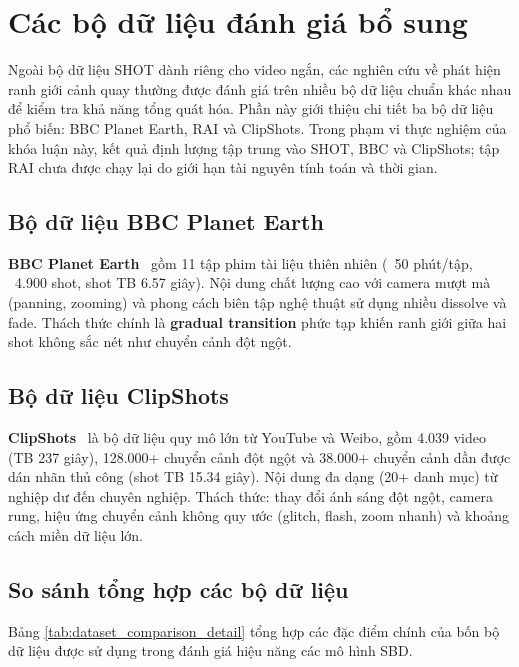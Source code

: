 \section{Các bộ dữ liệu đánh giá bổ sung}
Ngoài bộ dữ liệu SHOT dành riêng cho video ngắn, các nghiên cứu về phát hiện ranh giới cảnh quay thường được đánh giá trên nhiều bộ dữ liệu chuẩn khác nhau để kiểm tra khả năng tổng quát hóa. Phần này giới thiệu chi tiết ba bộ dữ liệu phổ biến: BBC Planet Earth, RAI và ClipShots.
Trong phạm vi thực nghiệm của khóa luận này, kết quả định lượng tập trung vào SHOT, BBC và ClipShots; tập RAI chưa được chạy lại do giới hạn tài nguyên tính toán và thời gian.

\subsection{Bộ dữ liệu BBC Planet Earth}
\textbf{BBC Planet Earth}~\cite{baraldi2015rai} gồm 11 tập phim tài liệu thiên nhiên (~50 phút/tập, ~4.900 shot, shot TB 6.57 giây). Nội dung chất lượng cao với camera mượt mà (panning, zooming) và phong cách biên tập nghệ thuật sử dụng nhiều dissolve và fade. Thách thức chính là \textbf{gradual transition} phức tạp khiến ranh giới giữa hai shot không sắc nét như chuyển cảnh đột ngột.

\subsection{Bộ dữ liệu ClipShots}
\textbf{ClipShots}~\cite{tang2018clipshots} là bộ dữ liệu quy mô lớn từ YouTube và Weibo, gồm 4.039 video (TB 237 giây), 128.000+ chuyển cảnh đột ngột và 38.000+ chuyển cảnh dần được dán nhãn thủ công (shot TB 15.34 giây). Nội dung đa dạng (20+ danh mục) từ nghiệp dư đến chuyên nghiệp. Thách thức: thay đổi ánh sáng đột ngột, camera rung, hiệu ứng chuyển cảnh không quy ước (glitch, flash, zoom nhanh) và khoảng cách miền dữ liệu lớn.

\subsection{So sánh tổng hợp các bộ dữ liệu}
\label{sec:dataset_summary}
Bảng \ref{tab:dataset_comparison_detail} tổng hợp các đặc điểm chính của bốn bộ dữ liệu được sử dụng trong đánh giá hiệu năng các mô hình SBD.

